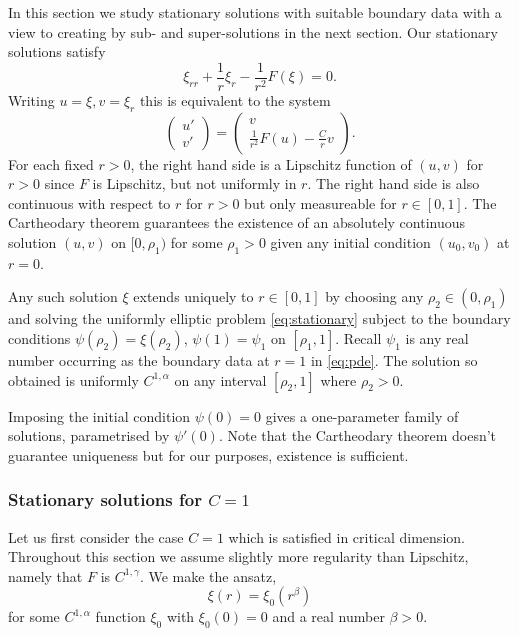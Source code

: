 \documentclass{amsart}
\begin{document}
In this section we study stationary solutions with suitable boundary data with a view to creating by sub- and super-solutions in the next section. Our stationary solutions satisfy
\begin{equation}
\label{eq:stationary}
\xi_{rr} + \frac{1}{r} \xi_r - \frac{1}{r^2} F(\xi)  = 0.
\end{equation}
Writing \(u = \xi, v = \xi_r\) this is equivalent to the system
\[
\begin{pmatrix}
u' \\
v'
\end{pmatrix}
=
\begin{pmatrix}
v \\
\frac{1}{r^2} F(u) - \frac{C}{r} v
\end{pmatrix}.
\]
For each fixed \(r > 0\), the right hand side is a Lipschitz function of \((u,v)\) for \(r>0\) since \(F\) is Lipschitz, but not uniformly in \(r\). The right hand side is also continuous with respect to \(r\) for \(r > 0\) but only measureable for \(r \in [0, 1]\). The Cartheodary theorem guarantees the existence of an absolutely continuous solution \((u, v)\) on \([0, \rho_1)\) for some  \(\rho_1 > 0\) given any initial condition \((u_0, v_0)\) at \(r=0\).

Any such solution \(\xi\) extends uniquely to \(r \in [0, 1]\) by choosing any \(\rho_2 \in (0, \rho_1)\) and solving the uniformly elliptic problem \eqref{eq:stationary} subject to the boundary conditions \(\psi(\rho_2) = \xi(\rho_2)\), \(\psi(1) = \psi_1\) on \([\rho_1, 1]\). Recall \(\psi_1\) is any real number occurring as the boundary data at \(r=1\) in \eqref{eq:pde}. The solution so obtained is uniformly \(C^{1,\alpha}\) on any interval \([\rho_2, 1]\) where \(\rho_2 > 0\).

Imposing the initial condition \(\psi(0) = 0\) gives a one-parameter family of solutions, parametrised by \(\psi'(0)\). Note that the Cartheodary theorem doesn't guarantee uniqueness but for our purposes, existence is sufficient.

\subsubsection*{Stationary solutions for \(C=1\)}

Let us first consider the case \(C = 1\) which is satisfied in critical dimension. Throughout this section we assume slightly more regularity than Lipschitz, namely that \(F\) is \(C^{1,\gamma}\).  We make the ansatz,
\[
\xi(r) = \xi_0(r^{\beta})
\]
for some \(C^{1,\alpha}\) function \(\xi_0\) with \(\xi_0(0) = 0\) and a real number \(\beta > 0\).
\end{document}
